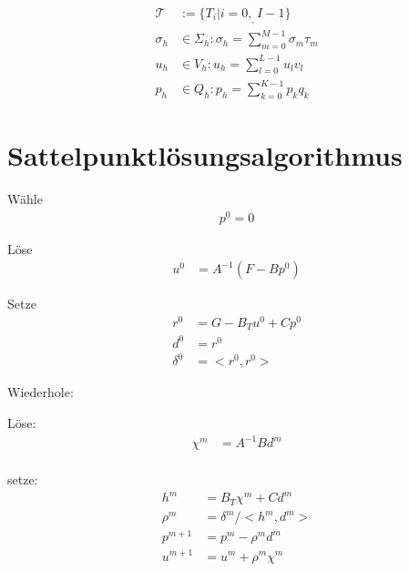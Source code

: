 \begin{definition}
        \begin{align*}
            \mathcal{T} &:= \{ T_i | i = 0,_,I-1\} \\
            \sigma_h &\in \Sigma_h : \sigma_h = \sum_{m=0}^{M-1}{\sigma_m\tau_m}\\
            u_h &\in V_h : u_h = \sum_{l=0}^{L-1}{u_l v_l} \\
            p_h &\in Q_h : p_h = \sum_{k=0}^{K-1}{p_k q_k} 
        \end{align*}
    \end{definition}


\section{Sattelpunktlösungsalgorithmus}
\begin{itemize}
 \begin{item}{Wähle}
	\begin{align*}
		p^0 = 0	 
	\end{align*}
 \end{item}
 \begin{item}{Löse}
	\begin{align*}
	 	u^0 &= A^{-1} ( F - B p^0)
	\end{align*}
 \end{item} 
 \begin{item}{Setze}
	\begin{align*}
	 	r^0 &= G - B_T u^0 + C p^0 \\
		d^0 &= r^0 \\
		\delta^0 &= < r^0, r^0 >
	\end{align*}
 \end{item} 
 \begin{item}{Wiederhole:}
	\begin{itemize}
		\begin{item}{Löse:}
			\begin{align*}
				\chi^m &= A^{-1} B d^m \\
			\end{align*}
		\end{item} 
		\begin{item}{setze:}
			\begin{align*}
				h^m &= B_T \chi^m + C d^m \\
				\rho^m &= \delta^m / < h^m,d^m> \\
				p^{m+1} &= p^m - \rho^m d^m \\
				u^{m+1} &= u^m + \rho^m \chi^m \\

\end{align*}
\end{item}
\end{itemize}
\end{item}
\end{itemize}
